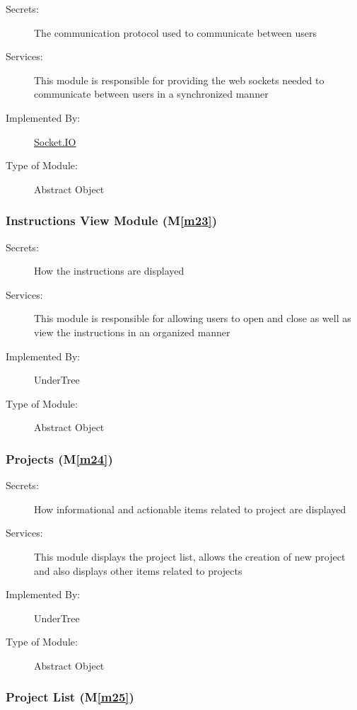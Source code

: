 \documentclass[12pt, titlepage]{article}
\newcommand{\mref}[1]{M\ref{#1}}
\begin{document}
	\begin{description}
		\item[Secrets:] The communication protocol used to communicate between users
		\item[Services:] This module is responsible for providing the web sockets needed to communicate between users in a synchronized manner
		\item[Implemented By:] \href{https://socket.io/docs/v4/}{Socket.IO}
		\item[Type of Module:] Abstract Object
	\end{description}
	
	\subsubsection{Instructions View Module (\mref{m23})}
	
	\begin{description}
		\item[Secrets:] How the instructions are displayed
		\item[Services:] This module is responsible for allowing users to open and close as well as view the instructions in an organized manner
		\item[Implemented By:] UnderTree
		\item[Type of Module:] Abstract Object
	\end{description}
	
	\subsubsection{Projects (\mref{m24})}
	
	\begin{description}
		\item[Secrets:] How informational and actionable items related to project are displayed
		\item[Services:] This module displays the project list, allows the creation of new project and also displays other items related to projects
		\item[Implemented By:] UnderTree
		\item[Type of Module:] Abstract Object
	\end{description}
	
	\subsubsection{Project List (\mref{m25})}
	
\end{document}
